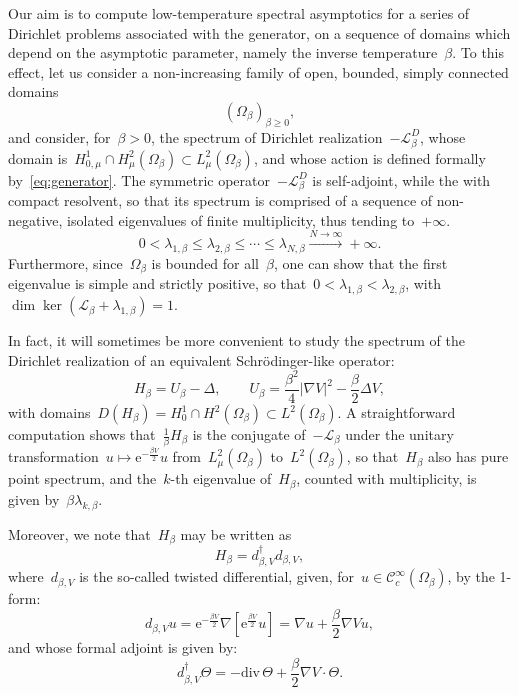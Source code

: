 \documentclass[10pt]{article}
\newcommand{\cL}{\mathcal{L}}
\newcommand{\e}{\mathrm{e}}
\renewcommand{\div}{\mathrm{div}}
\newcommand{\1}{\mathbbm 1}
\begin{document}
    Our aim is to compute low-temperature spectral asymptotics for a series of Dirichlet problems associated with the generator, on a sequence of domains which depend on the asymptotic parameter, namely the inverse temperature~$\beta$.
    To this effect, let us consider a non-increasing family of open, bounded, simply connected domains
    \[(\Omega_\beta)_{\beta \geq 0},\]
    and consider, for~$\beta>0$, the spectrum of Dirichlet realization~$-\cL_\beta^D$, whose domain is~${H_{0,\mu}^1\cap H^2_{\mu}(\Omega_\beta) \subset L^2_\mu(\Omega_\beta)}$,
    and whose action is defined formally by~\eqref{eq:generator}.
    The symmetric operator~$-\cL_\beta^D$ is self-adjoint, while the  with compact resolvent, so that its spectrum is comprised of a sequence of non-negative, isolated eigenvalues of finite multiplicity, thus tending to~$+\infty$.
   ~$$0<\lambda_{1,\beta} \leq \lambda_{2,\beta}\leq \dotsm \leq\lambda_{N,\beta} \xrightarrow{N\to\infty}+\infty.$$
    Furthermore, since~$\Omega_\beta$ is bounded for all~$\beta$, one can show that the first eigenvalue is simple and strictly positive, so that~$0<\lambda_{1,\beta} < \lambda_{2,\beta}$, with~$\dim \ker \left(\cL_\beta+\lambda_{1,\beta}\right)=1$.

    In fact, it will sometimes be more convenient to study the spectrum of the Dirichlet realization of an equivalent Schrödinger-like operator:
    \begin{equation}
        \label{eq:witten_laplacian}
        H_{\beta} = U_\beta - \Delta,\qquad U_\beta = \frac{\beta^2}4|\nabla V|^2 - \frac{\beta}2 \Delta V,
    \end{equation}
    with domains~$D(H_\beta)=H_0^1\cap H^2(\Omega_\beta) \subset L^2(\Omega_\beta)$. A straightforward computation shows that~$\frac1{\beta}H_\beta$ is the conjugate of~$-\cL_\beta$ under the unitary transformation~$u\mapsto \e^{-\frac{\beta V}2}u$ from~$L_\mu^2(\Omega_\beta)$ to~$L^2(\Omega_\beta)$, so that~$H_\beta$ also has pure point spectrum, and the~$k$-th eigenvalue of~$H_\beta$, counted with multiplicity, is given by~$\beta\lambda_{k,\beta}$.

    Moreover, we note that~$H_\beta$ may be written as
    \begin{equation}
        \label{eq:factorization_witten}
        H_\beta = d_{\beta,V}^\dagger d_{\beta,V},
    \end{equation}
    where~$d_{\beta,V}$ is the so-called twisted differential, given, for~$u\in \mathcal C_c^\infty(\Omega_\beta)$, by the 1-form:
    \begin{equation}
        \label{eq:twisted_differential}
        d_{\beta,V}u = \e^{-\frac{\beta V}2}\nabla\left[\e^{\frac{\beta V}2}u\right] = \nabla u + \frac\beta 2\nabla V u,
    \end{equation}
    and whose formal adjoint is given by:
    \begin{equation}
        \label{eq:twisted_differential_adjoint}
        d_{\beta,V}^\dagger \Theta = -\div\, \Theta +\frac\beta 2 \nabla V \cdot \Theta.
    \end{equation}
\end{document}
